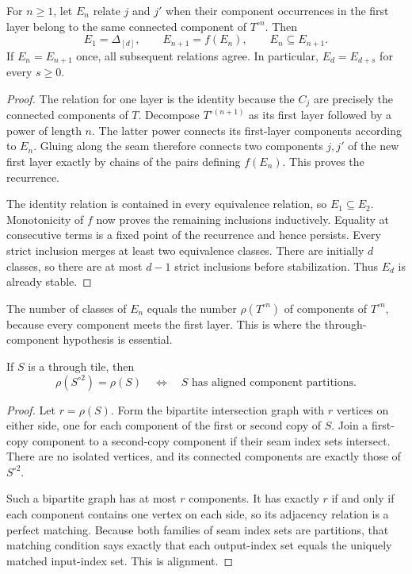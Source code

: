 \begin{lemma}
\label{lem:through-stabilization}
For $n\geq1$, let $E_n$ relate $j$ and $j'$ when their component occurrences
in the first layer belong to the same connected component of $T^{\circ n}$.
Then
\[
 E_1=\Delta_{[d]},\qquad E_{n+1}=f(E_n),\qquad E_n\subseteq E_{n+1}.
\]
If $E_n=E_{n+1}$ once, all subsequent relations agree.  In particular,
$E_d=E_{d+s}$ for every $s\geq0$.
\end{lemma}

\begin{proof}
The relation for one layer is the identity because the $C_j$ are precisely
the connected components of $T$.  Decompose $T^{\circ(n+1)}$ as its first
layer followed by a power of length $n$.  The latter power connects its
first-layer components according to $E_n$.  Gluing along the seam therefore
connects two components $j,j'$ of the new first layer exactly by chains of
the pairs defining $f(E_n)$.  This proves the recurrence.

The identity relation is contained in every equivalence relation, so
$E_1\subseteq E_2$.  Monotonicity of $f$ now proves the remaining inclusions
inductively.  Equality at consecutive terms is a fixed point of the recurrence
and hence persists.  Every strict inclusion merges at least two equivalence
classes.  There are initially $d$ classes, so there are at most $d-1$ strict
inclusions before stabilization.  Thus $E_d$ is already stable.
\end{proof}

The number of classes of $E_n$ equals the number $\rho(T^{\circ n})$ of
components of $T^{\circ n}$, because every component meets the first layer.
This is where the through-component hypothesis is essential.

\begin{lemma}
\label{lem:through-rank-alignment}
If $S$ is a through tile, then
\[
 \rho(S^{\circ2})=\rho(S)
 \quad\Longleftrightarrow\quad
 S\text{ has aligned component partitions}.
\]
\end{lemma}

\begin{proof}
Let $r=\rho(S)$.  Form the bipartite intersection graph with $r$ vertices
on either side, one for each component of the first or second copy of $S$.
Join a first-copy component to a second-copy component if their seam index
sets intersect.  There are no isolated vertices, and its connected components
are exactly those of $S^{\circ2}$.

Such a bipartite graph has at most $r$ components.  It has exactly $r$ if
and only if each component contains one vertex on each side, so its adjacency
relation is a perfect matching.  Because both families of seam index sets
are partitions, that matching condition says exactly that each output-index
set equals the uniquely matched input-index set.  This is alignment.
\end{proof}

